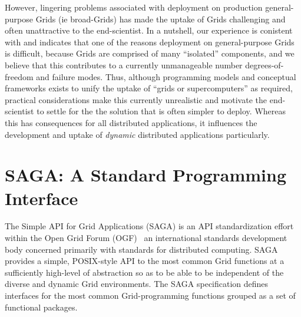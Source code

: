 \documentclass{llncs}
\begin{document}


However, lingering problems associated with deployment on production
general-purpose Grids (ie broad-Grids) has made the uptake of Grids
challenging and often unattractive to the end-scientist. In a
nutshell, our experience is conistent with and indicates that one of
the reasons deployment on general-purpose Grids is difficult, because
Grids are comprised of many ``isolated'' components, and we believe
that this contributes to a currently unmanageable number
degrees-of-freedom and failure modes.  Thus, although programming
models and conceptual frameworks exists to unify the uptake of ``grids
or supercomputers'' as required, practical considerations make this
currently unrealistic and motivate the end-scientist to settle for the
the solution that is often simpler to deploy. Whereas this has
consequences for all distributed applications, it influences the
development and uptake of {\it dynamic} distributed applications
particularly.




\section{SAGA: A Standard Programming Interface}

The Simple API for Grid Applications (SAGA) is an API standardization
effort within the Open Grid Forum (OGF)~\cite{ogf_web} an
international standards development body concerned primarily with
standards for distributed computing.  SAGA provides a simple,
POSIX-style API to the most common Grid functions at a sufficiently
high-level of abstraction so as to be able to be independent of the
diverse and dynamic Grid environments.  The SAGA specification defines
interfaces for the most common Grid-programming functions grouped as a
set of functional packages.  
\end{document}
